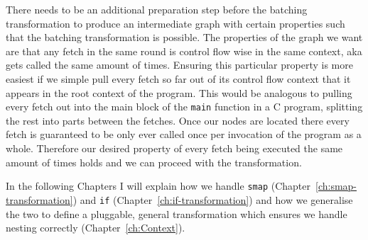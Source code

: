 There needs to be an additional preparation step before the batching transformation to produce an intermediate graph with certain properties such that the batching transformation is possible.
The properties of the graph we want are that any fetch in the same round is control flow wise in the same context, aka gets called the same amount of times.
Ensuring this particular property is more easiest if we simple pull every fetch so far out of its control flow context that it appears in the root context of the program.
This would be analogous to pulling every fetch out into the main block of the \texttt{main} function in a C program, splitting the rest into parts between the fetches.
Once our nodes are located there every fetch is guaranteed to be only ever called once per invocation of the program as a whole.
Therefore our desired property of every fetch being executed the same amount of times holds and we can proceed with the transformation.

In the following Chapters I will explain how we handle \texttt{smap} (Chapter~\ref{ch:smap-transformation}) and \texttt{if} (Chapter~\ref{ch:if-transformation}) and how we generalise the two to define a pluggable, general transformation which ensures we handle nesting correctly (Chapter~\ref{ch:Context}).

